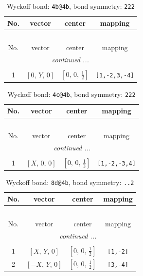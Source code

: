 \documentclass[fleqn,8pt]{jsarticle}
\begin{document}
\begin{longtable}{cccc}
\caption{Wyckoff bond: {\tt 4b@4b}, bond symmetry: {\tt 222}}
 \\
 \hline \hline
No. & vector & center & mapping \\ \hline \endfirsthead

\multicolumn{3}{l}{\tablename\ \thetable{}} \\
 \hline \hline
No. & vector & center & mapping \\ \hline \endhead

 \hline \hline
\multicolumn{3}{r}{\footnotesize\it continued ...} \\ \endfoot

 \hline \hline
\multicolumn{3}{r}{} \\ \endlastfoot

1 & $\left[ 0,\, Y,\, 0 \right]$ & $\left[ 0,\, 0,\, \frac{1}{2} \right]$ & {\tt [1,-2,3,-4]} \\
\end{longtable}
\renewcommand{\arraystretch}{1.2}
\begin{longtable}{cccc}
\caption{Wyckoff bond: {\tt 4c@4b}, bond symmetry: {\tt 222}}
 \\
 \hline \hline
No. & vector & center & mapping \\ \hline \endfirsthead

\multicolumn{3}{l}{\tablename\ \thetable{}} \\
 \hline \hline
No. & vector & center & mapping \\ \hline \endhead

 \hline \hline
\multicolumn{3}{r}{\footnotesize\it continued ...} \\ \endfoot

 \hline \hline
\multicolumn{3}{r}{} \\ \endlastfoot

1 & $\left[ X,\, 0,\, 0 \right]$ & $\left[ 0,\, 0,\, \frac{1}{2} \right]$ & {\tt [1,-2,-3,4]} \\
\end{longtable}
\renewcommand{\arraystretch}{1.2}
\begin{longtable}{cccc}
\caption{Wyckoff bond: {\tt 8d@4b}, bond symmetry: {\tt ..2}}
 \\
 \hline \hline
No. & vector & center & mapping \\ \hline \endfirsthead

\multicolumn{3}{l}{\tablename\ \thetable{}} \\
 \hline \hline
No. & vector & center & mapping \\ \hline \endhead

 \hline \hline
\multicolumn{3}{r}{\footnotesize\it continued ...} \\ \endfoot

 \hline \hline
\multicolumn{3}{r}{} \\ \endlastfoot

1 & $\left[ X,\, Y,\, 0 \right]$ & $\left[ 0,\, 0,\, \frac{1}{2} \right]$ & {\tt [1,-2]} \\ \hline
2 & $\left[ - X,\, Y,\, 0 \right]$ & $\left[ 0,\, 0,\, \frac{1}{2} \right]$ & {\tt [3,-4]} \\
\end{longtable}
\end{document}
